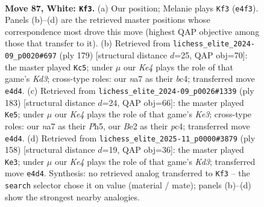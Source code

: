 \documentclass[11pt]{article}
\begin{document}
\clearpage

\begin{figure}[p]\centering
\begin{subfigure}{0.46\textwidth}\centering
\resizebox{\linewidth}{!}{%
\newchessgame
\chessboard[
  setfen={4r3/n7/P2k4/8/4K3/1R4PP/2P1B3/8 w - - 7 87},
  showmover=false,
  pgfstyle=straightmove, color=movearrow, markmove={e4-f3}
]}
\caption{}
\end{subfigure}\hfill
\begin{subfigure}{0.46\textwidth}\centering
\resizebox{\linewidth}{!}{%
\newchessgame
\chessboard[
  setfen={8/8/3k3R/8/2B1K1p1/7p/6r1/8 b - - 3 90},
  showmover=false,
  pgfstyle=straightmove, color=movearrow, markmove={d6-c5}
]}
\caption{}
\end{subfigure}
\\[4pt]
\begin{subfigure}{0.46\textwidth}\centering
\resizebox{\linewidth}{!}{%
\newchessgame
\chessboard[
  setfen={8/8/R3k1p1/7p/2Pp3b/5K2/8/8 b - - 0 92},
  showmover=false,
  pgfstyle=straightmove, color=movearrow, markmove={e6-e5}
]}
\caption{}
\end{subfigure}\hfill
\begin{subfigure}{0.46\textwidth}\centering
\resizebox{\linewidth}{!}{%
\newchessgame
\chessboard[
  setfen={5B2/8/R6P/3k4/7P/3K4/8/3r4 w - - 1 80},
  showmover=false,
  pgfstyle=straightmove, color=movearrow, markmove={d3-e3}
]}
\caption{}
\end{subfigure}
\caption{\textbf{Move 87, White: \texttt{Kf3}.} (a) Our position; Melanie plays \texttt{Kf3} (\texttt{e4f3}). Panels (b)--(d) are the retrieved master positions whose correspondence most drove this move (highest QAP objective among those that transfer to it). (b) Retrieved from \texttt{lichess\_elite\_2024-09\_p0020\#697} (ply 179) [structural distance $d$=25, QAP obj=70]: the master played \texttt{Kc5}; under $\mu$ our \emph{Ke4} plays the role of that game's \emph{Kd3}; cross-type roles: our \emph{n}a7 as their \emph{b}c4; transferred move \texttt{e4d4}. (c) Retrieved from \texttt{lichess\_elite\_2024-09\_p0026\#1339} (ply 183) [structural distance $d$=24, QAP obj=66]: the master played \texttt{Ke5}; under $\mu$ our \emph{Ke4} plays the role of that game's \emph{Ke3}; cross-type roles: our \emph{n}a7 as their \emph{P}h5, our \emph{B}e2 as their \emph{p}c4; transferred move \texttt{e4d4}. (d) Retrieved from \texttt{lichess\_elite\_2025-11\_p0000\#3879} (ply 158) [structural distance $d$=19, QAP obj=36]: the master played \texttt{Ke3}; under $\mu$ our \emph{Ke4} plays the role of that game's \emph{Kd3}; transferred move \texttt{e4d4}. Synthesis: no retrieved analog transferred to \texttt{Kf3} -- the \texttt{search} selector chose it on value (material / mate); panels (b)--(d) show the strongest nearby analogies.}
\label{fig:thought-m172}
\end{figure}
\end{document}
